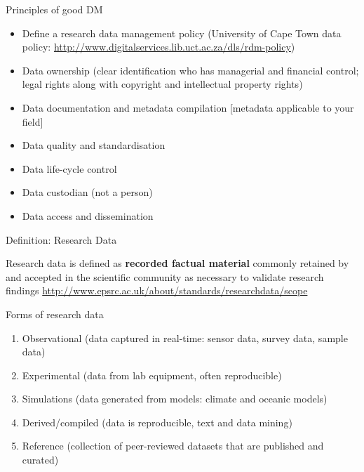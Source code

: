 \documentclass[english,aspectratio=169]{beamer}
\begin{document}
\begin{frame}{Principles of good DM}
\begin{itemize}
\item Define a research data management policy (University of Cape Town
data policy: \href{http://www.digitalservices.lib.uct.ac.za/dls/rdm-policy}{http://www.digitalservices.lib.uct.ac.za/dls/rdm-policy})
\item Data ownership (clear identification who has managerial and financial
control; legal rights along with copyright and intellectual property
rights)
\item Data documentation and metadata compilation {[}metadata applicable
to your field{]}
\item Data quality and standardisation
\item Data life-cycle control
\item Data custodian (not a person)
\item Data access and dissemination
\end{itemize}
\end{frame}

\begin{frame}{Definition: Research Data}

Research data is defined as \textbf{recorded factual material} commonly retained by and accepted in the scientific community as necessary to validate research findings \href{http://www.epsrc.ac.uk/about/standards/researchdata/scope}{http://www.epsrc.ac.uk/about/standards/researchdata/scope} 

Forms of research data
\begin{enumerate}
\item Observational (data captured in real-time: sensor data, survey data, sample data)
\item Experimental (data from lab equipment, often reproducible)
\item Simulations (data generated from models: climate and oceanic models)
\item Derived/compiled (data is reproducible, text and data mining)
\item Reference (collection of peer-reviewed datasets that are published
and curated)
\end{enumerate}
\end{frame}
\end{document}
